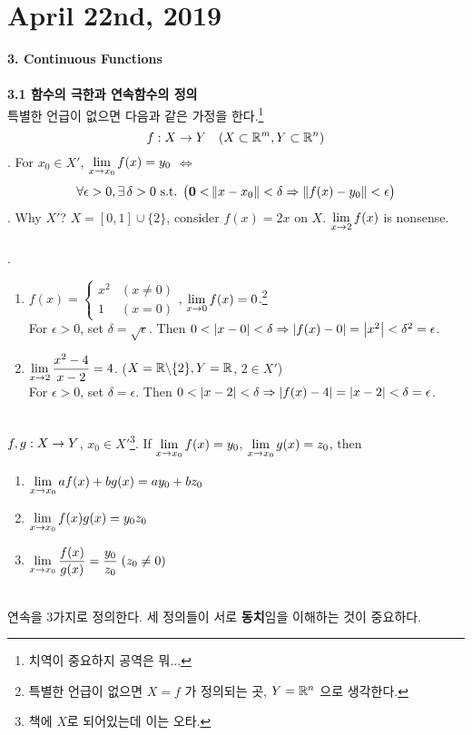 \section*{April 22nd, 2019}
\textbf{\large 3. Continuous Functions}\\
\\
\textbf{3.1 함수의 극한과 연속함수의 정의}\\
특별한 언급이 없으면 다음과 같은 가정을 한다.\footnote{치역이 중요하지 공역은 뭐...} $$f:X\rightarrow Y \quad ( X\subset \mathbb{R}^m, Y\subset \mathbb{R}^n )$$
. For $x_0\in X'$, $\displaystyle \lim_{x\rightarrow x_0} f(x) = y_0$ $\iff$ $$\forall \epsilon >0, \exists\, \delta > 0 \text{ s.t. } \big(\mathbf{0 <} \left\lVert x-x_0\right\rVert < \delta \Rightarrow \left\lVert f(x) - y_0\right\rVert < \epsilon\big)$$
\rmk. Why $X'$? $X = [0, 1]\cup \{2\}$, consider $f(x) = 2x$ on $X$. $\displaystyle \lim_{x\rightarrow 2} f(x)$ is nonsense.\\
\\
\ex.
\begin{enumerate}
	\item $f(x)=\begin{cases}
		x^2 & (x\neq 0)\\ 1 & (x = 0)
	\end{cases}$, $\displaystyle \lim_{x\rightarrow 0} f(x) = 0$.\footnote{특별한 언급이 없으면 $X = f$ 가 정의되는 곳, $Y = \mathbb{R}^n$ 으로 생각한다.}\\
	For $\epsilon >0$, set $\delta = \sqrt{\epsilon}$. Then $0 < \left|x - 0\right| < \delta \Rightarrow \left|f(x) - 0\right| = \left|x^2\right| < \delta^2 = \epsilon$.
	\item $\displaystyle \lim_{x\rightarrow 2} \frac{x^2-4}{x-2} =4$. ($X = \mathbb{R}\backslash \{2\}, Y = \mathbb{R}$, $2 \in X'$)\\
	For $\epsilon > 0$, set $\delta = \epsilon$. Then $0<\left|x - 2\right| < \delta \Rightarrow \left|f(x) - 4\right| = \left|x -2\right| < \delta = \epsilon$.
\end{enumerate}~\\
 $f, g: X\rightarrow Y$, $x_0\in X'$\footnote{책에 $X$로 되어있는데 이는 오타.}. If $\displaystyle \lim_{x\rightarrow x_0} f(x) = y_0$, $\displaystyle \lim_{x\rightarrow x_0} g(x) = z_0$, then
\begin{enumerate}
	\item $\displaystyle \lim_{x\rightarrow x_0} af(x) + bg(x) = ay_0+bz_0$
	\item $\displaystyle \lim_{x\rightarrow x_0} f(x)g(x) = y_0z_0$
	\item $\displaystyle \lim_{x\rightarrow x_0} \frac{f(x)}{g(x)} = \frac{y_0}{z_0} \;(z_0\neq 0)$
\end{enumerate}~\\
연속을 3가지로 정의한다. 세 정의들이 서로 \textbf{동치}임을 이해하는 것이 중요하다.\\
